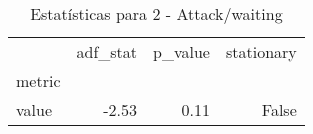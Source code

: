 \begin{table}[htbp]
\caption{Estatísticas para 2 - Attack/waiting}
\label{tab:2_-_attack_waiting_adf_test}
\begin{tabular}{lrrr}
\toprule
 & adf_stat & p_value & stationary \\
metric &  &  &  \\
\midrule
value & -2.53 & 0.11 & False \\
\bottomrule
\end{tabular}
\end{table}
